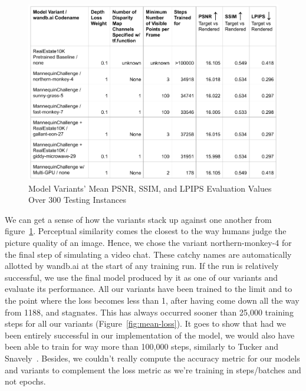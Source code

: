 \begin{figure}[!h]
    \includegraphics[width=1\columnwidth]{figures/model-variants-metrics.png}
    \caption{Model Variants' Mean PSNR, SSIM, and LPIPS Evaluation Values Over 300 Testing Instances}
    \label{fig:model-variants-metrics}
\end{figure}

We can get a sense of how the variants stack up against one another from figure~\ref{fig:model-variants-metrics}. Perceptual similarity comes the closest to the way humans judge the picture quality of an image. Hence, we chose the variant northern-monkey-4 for the final step of simulating a video chat. These catchy names are automatically allotted by wandb.ai at the start of any training run. If the run is relatively successful, we use the final model produced by it as one of our variants and evaluate its performance. All our variants have been trained to the limit and to the point where the loss becomes less than 1, after having come down all the way from 1188, and stagnates. This has always occurred sooner than 25,000 training steps for all our variants (Figure~\ref{fig:mean-loss}). It goes to show that had we been entirely successful in our implementation of the model, we would also have been able to train for way more than 100,000 steps, similarly to Tucker and Snavely~\cite{single_view_mpi}. Besides, we couldn't really compute the accuracy metric for our models and variants to complement the loss metric as we're training in steps/batches and not epochs.

